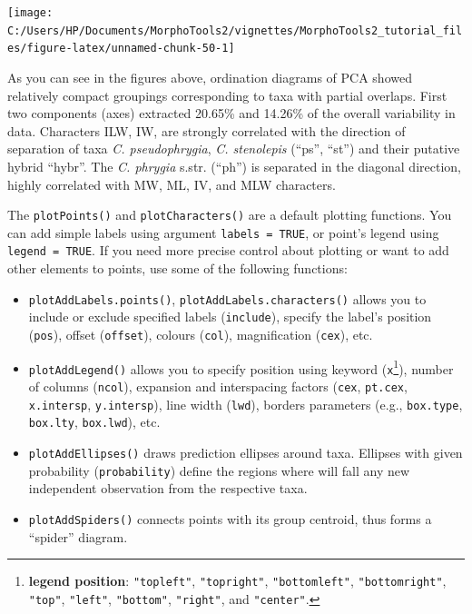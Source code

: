 \documentclass[
]{article}
\newenvironment{Shaded}{\begin{snugshade}}{\end{snugshade}}
\newcommand{\DataTypeTok}[1]{\textcolor[rgb]{0.13,0.29,0.53}{#1}}
\newcommand{\KeywordTok}[1]{\textcolor[rgb]{0.13,0.29,0.53}{\textbf{#1}}}
\newcommand{\NormalTok}[1]{#1}
\newcommand{\OperatorTok}[1]{\textcolor[rgb]{0.81,0.36,0.00}{\textbf{#1}}}
\newcommand{\StringTok}[1]{\textcolor[rgb]{0.31,0.60,0.02}{#1}}
\begin{document}
\begin{center}\texttt{[image: C:/Users/HP/Documents/MorphoTools2/vignettes/MorphoTools2\_tutorial\_files/figure-latex/unnamed-chunk-50-1]} \end{center}

\begin{Shaded}
\end{Shaded}

As you can see in the figures above, ordination diagrams of PCA showed
relatively compact groupings corresponding to taxa with partial
overlaps. First two components (axes) extracted 20.65\% and 14.26\% of
the overall variability in data. Characters ILW, IW, are strongly
correlated with the direction of separation of taxa \emph{C.
pseudophrygia}, \emph{C. stenolepis} (``ps'', ``st'') and their putative
hybrid ``hybr''. The \emph{C. phrygia} s.str. (``ph'') is separated in
the diagonal direction, highly correlated with MW, ML, IV, and MLW
characters.

The \texttt{plotPoints()} and \texttt{plotCharacters()} are a default
plotting functions. You can add simple labels using argument
\texttt{labels\ =\ TRUE}, or point's legend using
\texttt{legend\ =\ TRUE}. If you need more precise control about
plotting or want to add other elements to points, use some of the
following functions:

\begin{itemize}
\item
  \texttt{plotAddLabels.points()}, \texttt{plotAddLabels.characters()}
  allows you to include or exclude specified labels (\texttt{include}),
  specify the label's position (\texttt{pos}), offset (\texttt{offset}),
  colours (\texttt{col}), magnification (\texttt{cex}), etc.
\item
  \texttt{plotAddLegend()} allows you to specify position using keyword
  (\texttt{x}\footnote{\textbf{legend position}: \texttt{"topleft"},
    \texttt{"topright"}, \texttt{"bottomleft"}, \texttt{"bottomright"},
    \texttt{"top"}, \texttt{"left"}, \texttt{"bottom"},
    \texttt{"right"}, and \texttt{"center"}.}), number of columns
  (\texttt{ncol}), expansion and interspacing factors (\texttt{cex},
  \texttt{pt.cex}, \texttt{x.intersp}, \texttt{y.intersp}), line width
  (\texttt{lwd}), borders parameters (e.g., \texttt{box.type},
  \texttt{box.lty}, \texttt{box.lwd}), etc.
\item
  \texttt{plotAddEllipses()} draws prediction ellipses around taxa.
  Ellipses with given probability (\texttt{probability}) define the
  regions where will fall any new independent observation from the
  respective taxa.
\item
  \texttt{plotAddSpiders()} connects points with its group centroid,
  thus forms a ``spider'' diagram.
\end{itemize}
\end{document}
